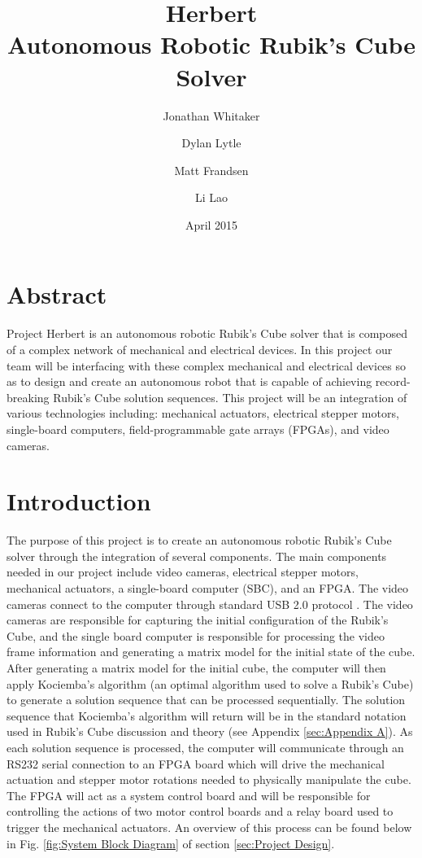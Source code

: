 \documentclass[11pt,english]{article}
\title{Herbert\\Autonomous Robotic Rubik's Cube Solver}
\author{
    Jonathan Whitaker\\
    \textt{jon.whitaker@utah.edu}
    \and
    Dylan Lytle\\
    \textt{dylan.lytle@utah.edu}
    \and
    Matt Frandsen\\
    \textt{matt.frandsen@utah.edu}
    \and
    Li Lao\\
    \textt{li.lao@utah.edu}
}
\date{April 2015}
\begin{document}
\maketitle

\tableofcontents

\section{Abstract}
Project Herbert is an autonomous robotic Rubik's Cube solver that is composed of a complex network of mechanical and electrical devices. In this project our team will be interfacing with these complex mechanical and electrical devices so as to design and create an autonomous robot that is capable of achieving record-breaking Rubik's Cube solution sequences.  This project will be an integration of various technologies including: mechanical actuators, electrical stepper motors, single-board computers, field-programmable gate arrays (FPGAs), and video cameras.

\section{Introduction}
The purpose of this project is to create an autonomous robotic Rubik's Cube solver through the integration of several components. The main components needed in our project include video cameras, electrical stepper motors, mechanical actuators, a single-board computer (SBC), and an FPGA. The video cameras connect to the computer through standard USB 2.0 protocol \cite{USB 2.0}. The video cameras are responsible for capturing the initial configuration of the Rubik's Cube, and the single board computer is responsible for processing the video frame information and generating a matrix model for the initial state of the cube. After generating a matrix model for the initial cube, the computer will then apply Kociemba's algorithm \cite{Kociemba} (an optimal algorithm used to solve a Rubik's Cube) to generate a solution sequence that can be processed sequentially. The solution sequence that Kociemba's algorithm will return will be in the standard notation used in Rubik's Cube discussion and theory (see Appendix \ref{sec:Appendix A}). As each solution sequence is processed, the computer will communicate through an RS232 serial connection to an FPGA board which will drive the mechanical actuation and stepper motor rotations needed to physically manipulate the cube. The FPGA will act as a system control board and will be responsible for controlling the actions of two motor control boards and a relay board used to trigger the mechanical actuators. An overview of this process can be found below in Fig. \ref{fig:System Block Diagram} of section \ref{sec:Project Design}.
\end{document}
